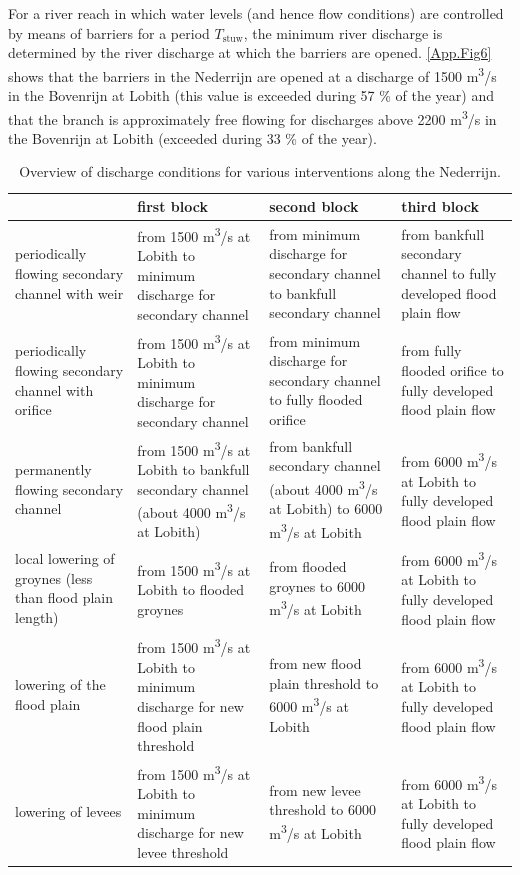 For a river reach in which water levels (and hence flow conditions) are controlled by means of barriers for a period $T_\text{stuw}$, the minimum river discharge is determined by the river discharge at which the barriers are opened.
\autoref{App.Fig6} shows that the barriers in the Nederrijn are opened at a discharge of 1500 m\textsuperscript{3}/s in the Bovenrijn at Lobith (this value is exceeded during 57 \% of the year) and that the branch is approximately free flowing for discharges above 2200 m\textsuperscript{3}/s in the Bovenrijn at Lobith (exceeded during 33 \% of the year).

\begin{table}
\begin{tabular}{p{}|p{}|p{}|p{}}
 & first block & second block & third block \\ \hline
periodically flowing secondary channel with weir & from 1500 m\textsuperscript{3}/s at Lobith to minimum discharge for secondary channel & from minimum discharge for secondary channel to bankfull secondary channel & from bankfull secondary channel to fully developed flood plain flow \\ \hline
periodically flowing secondary channel with orifice & from 1500 m\textsuperscript{3}/s at Lobith to minimum discharge for secondary channel & from minimum discharge for secondary channel to fully flooded orifice & from fully flooded orifice to fully developed flood plain flow \\ \hline
permanently flowing secondary channel & from 1500 m\textsuperscript{3}/s at Lobith to bankfull secondary channel (about 4000 m\textsuperscript{3}/s at Lobith) & from bankfull secondary channel (about 4000 m\textsuperscript{3}/s at Lobith) to 6000 m\textsuperscript{3}/s at Lobith & from 6000 m\textsuperscript{3}/s at Lobith to fully developed flood plain flow \\ \hline
local lowering of groynes (less than flood plain length) & from 1500 m\textsuperscript{3}/s at Lobith to flooded groynes & from flooded groynes to 6000 m\textsuperscript{3}/s at Lobith & from 6000 m\textsuperscript{3}/s at Lobith to fully developed flood plain flow \\ \hline
lowering of the flood plain & from 1500 m\textsuperscript{3}/s at Lobith to minimum discharge for new flood plain threshold & from new flood plain threshold to 6000 m\textsuperscript{3}/s at Lobith & from 6000 m\textsuperscript{3}/s at Lobith to fully developed flood plain flow \\ \hline
lowering of levees & from 1500 m\textsuperscript{3}/s at Lobith to minimum discharge for new levee threshold & from new levee threshold to 6000 m\textsuperscript{3}/s at Lobith & from 6000 m\textsuperscript{3}/s at Lobith to fully developed flood plain flow \\
\end{tabular}

\caption{Overview of discharge conditions for various interventions along the Nederrijn.}
\label{App.Tab2}
\end{table}

